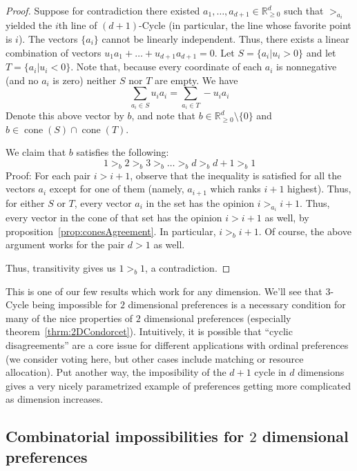 \documentclass[12pt]{article}
\newcommand{\Rgz}{\mathbb{R}_{\ge 0}}
\DeclareMathOperator*{\cone}{cone}
\newcommand{\1}[1]{\mathds{1}[{#1}]}
\begin{document}
    \begin{proof}
      Suppose for contradiction there existed
      $a_1,\ldots,a_{d+1}\in\Rgz^{d}$ such that $>_{a_i}$ yielded the $i$th line of
      $(d+1)$-{\sc Cycle} (in particular, the line whose favorite point is $i$).
      The vectors $\{a_i\}$ cannot be linearly independent.
      Thus, there exists a linear combination of vectors
      $u_1 a_1 + \ldots + u_{d+1} a_{d+1} = 0$.
      Let $S = \{a_i | u_i > 0\}$ and let $T = \{a_i | u_i < 0\}$.
      Note that, because every coordinate of each $a_i$ is nonnegative
      (and no $a_i$ is zero) neither $S$ nor $T$ are empty.
      We have
      \[ \sum_{a_i \in S} u_i a_i = \sum_{a_i \in T} -u_i a_i \]
      Denote this above vector by $b$, and note that 
      $b\in\Rgz^{d} \setminus \{0\}$ and $b\in \cone(S) \cap \cone(T)$.

      We claim that $b$ satisfies the following:
      \[ 1 >_b 2 >_b 3 >_b \ldots >_b d >_b d+1 >_b 1 \]
      Proof: For each pair $i > i+1$,
      observe that the inequality is satisfied for all the vectors $a_i$ except
      for one of them (namely, $a_{i+1}$ which ranks $i+1$ highest).
      Thus, for either $S$ or $T$, every vector $a_i$ in the set has the opinion
      $i >_{a_i} i+1$. Thus, every vector in the cone of that set
      has the opinion $i > i+1$ as well, by proposition~\ref{prop:conesAgreement}.
      In particular, $i >_b i+1$.
      Of course, the above argument works for the pair $d>1$ as well.

      Thus, transitivity gives us $1>_b 1$, a contradiction.
    \end{proof}
    This is one of our few results which work for any dimension.
    We'll see that $3$-{Cycle} being impossible for $2$ dimensional preferences
    is a necessary condition for many of the nice properties of $2$ dimensional
    preferences (especially theorem~\ref{thrm:2DCondorcet}).
    Intuitively, it is possible that ``cyclic disagreements'' are a core issue for
    different applications with ordinal preferences (we consider voting here, but
    other cases include matching or resource allocation).
    Put another way, the imposibility of the $d+1$ cycle in $d$ dimensions gives a
    very nicely parametrized example of preferences getting more complicated as
    dimension increases.


  \subsection{Combinatorial impossibilities for $2$ dimensional preferences}
\end{document}
